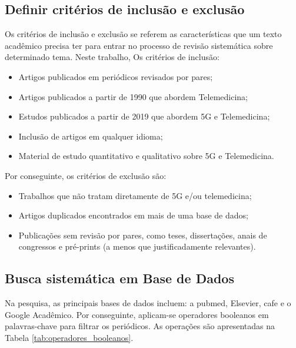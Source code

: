 \subsection{Definir critérios de inclusão e exclusão}

Os critérios de inclusão e exclusão se referem as características que um texto acadêmico precisa ter para entrar no processo de revisão sistemática sobre determinado tema. Neste trabalho, Os critérios de inclusão:

\begin{itemize}
    \item Artigos publicados em periódicos revisados por pares;
    \item Artigos publicados a partir de 1990 que abordem Telemedicina;
    \item Estudos publicados a partir de 2019 que abordem 5G e Telemedicina;
    \item Inclusão de artigos em qualquer idioma;
    \item Material de estudo quantitativo e qualitativo sobre 5G e Telemedicina.
\end{itemize}

\noindent Por conseguinte, os critérios de exclusão são:

\begin{itemize}
    \item Trabalhos que não tratam diretamente de 5G e/ou telemedicina;
    \item Artigos duplicados encontrados em mais de uma base de dados;
    \item Publicações sem revisão por pares, como teses, dissertações, anais de congressos e pré-prints (a menos que justificadamente relevantes).
\end{itemize}

\subsection{Busca sistemática em Base de Dados}
Na pesquisa, as principais bases de dados incluem: a \gls{pubmed}, Elsevier, \gls{cafe} e o Google Acadêmico. Por conseguinte, aplicam-se operadores booleanos em palavras-chave para filtrar os periódicos. As operações são apresentadas na Tabela \ref{tab:operadores_booleanos}.

